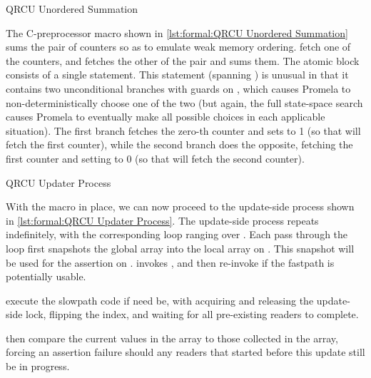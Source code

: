 \begin{listing}

\caption{QRCU Unordered Summation}
\label{lst:formal:QRCU Unordered Summation}
\end{listing}

\begin{fcvref}
The C-preprocessor macro shown in
\cref{lst:formal:QRCU Unordered Summation}
sums the pair of counters so as to emulate weak memory ordering.
 fetch one of the counters,
and  fetches the other
of the pair and sums them.
The atomic block consists of a single  statement.
This  statement (spanning ) is unusual in that
it contains two unconditional
branches with guards on , which causes Promela to
non-deterministically choose one of the two (but again, the full
state-space search causes Promela to eventually make all possible
choices in each applicable situation).
The first branch fetches the zero-th counter and sets  to 1 (so
that  will fetch the first counter), while the second
branch does the opposite, fetching the first counter and setting 
to 0 (so that  will fetch the second counter).
\end{fcvref}

\QuickQuizEnd

\begin{listing}
\caption{QRCU Updater Process}
\label{lst:formal:QRCU Updater Process}
\end{listing}

\begin{fcvref}
With the  macro in place, we can now proceed
to the update-side process shown in
\cref{lst:formal:QRCU Updater Process}.
The update-side process repeats indefinitely, with the corresponding
 loop ranging over .
Each pass through the loop first snapshots the global 
array into the local  array on
.
This snapshot will be used for the assertion on .
 invokes , and then
re-invoke  if the fastpath is potentially
usable.

 execute the slowpath code if need be, with
 acquiring and releasing the update-side lock,
 flipping the index, and
 waiting for
all pre-existing readers to complete.

 then compare the current values
in the 
array to those collected in the  array,
forcing an assertion failure should any readers that started before
this update still be in progress.
\end{fcvref}

